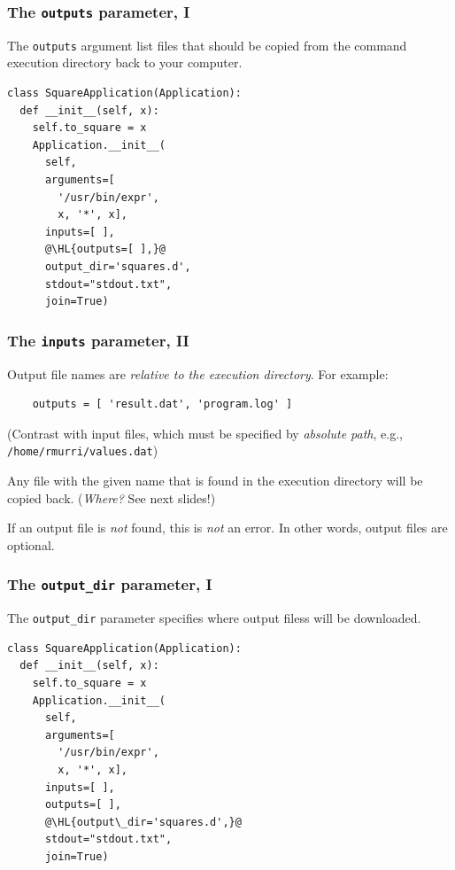 \documentclass[english,serif,mathserif,xcolor=pdftex,dvipsnames,table]{beamer}
\begin{document}
\begin{frame}[fragile]
\frametitle{The \texttt{outputs} parameter, I}

The \texttt{outputs} argument list files that should be copied from
the command execution directory back to your computer.

  \+
\begin{lstlisting}
class SquareApplication(Application):
  def __init__(self, x):
    self.to_square = x
    Application.__init__(
      self,
      arguments=[
        '/usr/bin/expr', 
        x, '*', x],
      inputs=[ ],
      @\HL{outputs=[ ],}@
      output_dir='squares.d',
      stdout="stdout.txt",
      join=True)
\end{lstlisting}
\end{frame}


\begin{frame}[fragile]
  \frametitle{The \texttt{inputs} parameter, II}

  Output file names are \emph{relative to the execution directory}.
  For example:
  \begin{lstlisting}
    outputs = [ 'result.dat', 'program.log' ]
  \end{lstlisting}

  \+ 
  (Contrast with input files, which must be specified by
  \emph{absolute path}, e.g., \texttt{/home/rmurri/values.dat})

  \+ 
  Any file with the given name that is found in the execution
  directory will be copied back. (\emph{Where?} See next slides!)

  \+ 
  If an output file is \emph{not} found, this is \emph{not} an
  error. In other words, output files are optional.

\end{frame}


\begin{frame}[fragile]
\frametitle{The \texttt{output\_dir} parameter, I}

The \lstinline|output_dir| parameter specifies where output filess
will be downloaded.

\+
\begin{lstlisting}
class SquareApplication(Application):
  def __init__(self, x):
    self.to_square = x
    Application.__init__(
      self,
      arguments=[
        '/usr/bin/expr', 
        x, '*', x],
      inputs=[ ],
      outputs=[ ],
      @\HL{output\_dir='squares.d',}@
      stdout="stdout.txt",
      join=True)
\end{lstlisting}
\end{frame}
\end{document}
